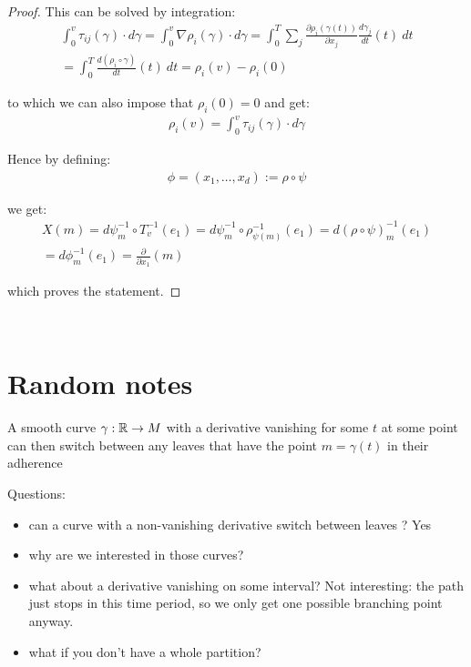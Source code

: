 \begin{proof}
                This can be solved by integration:
                \begin{gather*}
                    \int_{0}^{v} \tau_{ij}(\gamma) \cdot d \gamma = \int_{0}^{v} \nabla \rho_i(\gamma) \cdot d \gamma = \int_0^T \sum_j \frac{\partial \rho_i(\gamma(t))}{\partial x_j} \frac{d \gamma_j}{dt}(t) \: dt \\
                    = \int_0^T \frac{d(\rho_i \circ \gamma)}{dt}(t) \: dt = \rho_i(v) - \rho_i(0)
                \end{gather*}
    
                to which we can also impose that $\rho_i(0) = 0$ and get:
                \begin{align*}
                    \rho_i(v) = \int_{0}^{v} \tau_{ij}(\gamma) \cdot d \gamma
                \end{align*}
    
                Hence by defining:
                \begin{align*}
                    \phi = (x_1, \ldots, x_d) := \rho \circ \psi
                \end{align*}
    
                we get:
                \begin{gather*}
                    X(m) = d \psi_m^{-1} \circ T_v^{-1}(e_1) = d \psi_m^{-1} \circ \rho_{\psi(m)}^{-1}(e_1) = d(\rho \circ \psi)_m^{-1}(e_1) \\
                    = d \phi^{-1}_m(e_1) = \frac{\partial}{\partial x_1}(m)
                \end{gather*}
    
                which proves the statement.
        \end{proof}

\newpage
~
\newpage

\section{Random notes}

	A smooth curve $\gamma: \mathbb{R} \to M$ with a derivative vanishing for some $t$ at some point can then switch between any leaves that have the point $m = \gamma(t)$ in their adherence

	Questions:
	\begin{itemize}
		\item can a curve with a non-vanishing derivative switch between leaves ? Yes
		\item why are we interested in those curves?
		\item what about a derivative vanishing on some interval? Not interesting: the path just stops in this time period, so we only get one possible branching point anyway.
		\item what if you don't have a whole partition?
	\end{itemize}


